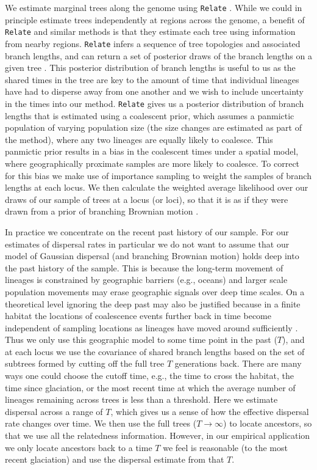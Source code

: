 \documentclass[12pt]{article}
\begin{document}
We estimate marginal trees along the genome using \texttt{Relate} \citep{speidel2019method}. While we could in principle estimate trees independently at regions across the genome, a benefit of \texttt{Relate} and similar methods is that they estimate each tree using information from nearby regions. \texttt{Relate} infers a sequence of tree topologies and associated branch lengths, and can return a set of posterior draws of the branch lengths on a given tree \citep[it was the only method that did so for a large number of samples when we began this work, but now see][]{wohns2021unified,deng2024robust}. This posterior distribution of branch lengths is useful to us as the shared times in the tree are key to the amount of time that individual lineages have had to disperse away from one another and we wish to include uncertainty in the times into our method. \texttt{Relate} gives us a posterior distribution of branch lengths that is estimated using a coalescent prior, which assumes a panmictic population of varying population size (the size changes are estimated as part of the method), where any two lineages are equally likely to coalesce. This panmictic prior results in a bias in the coalescent times under a spatial model, where geographically proximate samples are more likely to coalesce. To correct for this bias we make use of importance sampling to weight the samples of branch lengths at each locus. We then calculate the weighted average likelihood over our draws of our sample of trees at a locus (or loci), so that it is as if they were drawn from a prior of branching Brownian motion \citep{meligkotsidou2007postprocessing}. 

In practice we concentrate on the recent past history of our sample. For our estimates of dispersal rates in particular we do not want to assume that our model of Gaussian dispersal (and branching Brownian motion) holds deep into the past history of the sample. This is because the long-term movement of lineages is constrained by geographic barriers (e.g., oceans) and larger scale population movements may erase geographic signals over deep time scales. On a theoretical level ignoring the deep past may also be justified because in a finite habitat the locations of coalescence events further back in time become independent of sampling locations as lineages have moved around sufficiently \citep{wilkins2002coalescent}. Thus we only use this geographic model to some time point in the past ($T$), and at each locus we use the covariance of shared branch lengths based on the set of subtrees formed by cutting off the full tree $T$ generations back. There are many ways one could choose the cutoff time, e.g., the time to cross the habitat, the time since glaciation, or the most recent time at which the average number of lineages remaining across trees is less than a threshold. Here we estimate dispersal across a range of $T$, which gives us a sense of how the effective dispersal rate changes over time. We then use the full trees ($T\rightarrow\infty$) to locate ancestors, so that we use all the relatedness information. However, in our empirical application we only locate ancestors back to a time $T$ we feel is reasonable (to the most recent glaciation) and use the dispersal estimate from that $T$.
\end{document}
